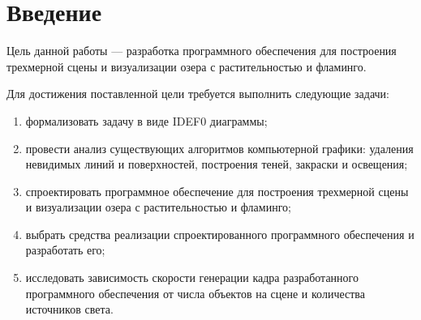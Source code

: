 \chapter*{Введение}


Цель данной работы --- разработка программного обеспечения для построения трехмерной сцены и визуализации озера с растительностью и фламинго.

Для достижения поставленной цели требуется выполнить следующие задачи:
\begin{enumerate}[label=\arabic*)]
	\item формализовать задачу в виде IDEF0 диаграммы;
	\item провести анализ существующих алгоритмов компьютерной графики: удаления невидимых линий и поверхностей, построения теней, закраски и освещения;
	\item спроектировать программное обеспечение для построения трехмерной сцены и визуализации озера с растительностью и фламинго;
	\item выбрать средства реализации спроектированного программного обеспечения и разработать его;
	\item исследовать зависимость скорости генерации кадра разработанного программного обеспечения от числа объектов на сцене и количества источников света.
\end{enumerate} 
